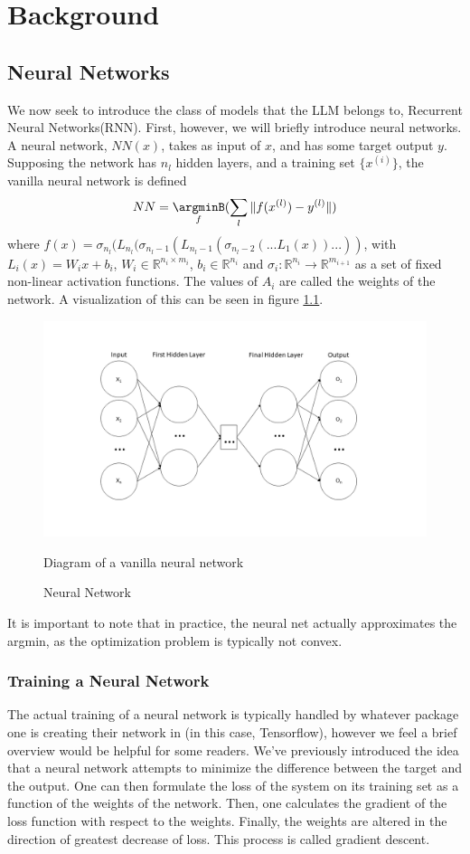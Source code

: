 \chapter{Background}
\label{Background}

\section{Neural Networks}
We now seek to introduce the class of models that the LLM belongs to, Recurrent Neural Networks(RNN). First, however, we will briefly introduce neural networks. A neural network, $NN(x)$, takes as input of $x$, and has some target output $y$. Supposing the network has $n_l$ hidden layers, and a training set $\{x^{(i)}\}$, the vanilla neural network is defined \begin{equation}
   NN = \underset{f}\argminB(\sum_l\|f(x^{(l)}) - y^{(l)}\|)
\end{equation} where $f(x) = \sigma_{n_l}(L_{n_l}(\sigma_{n_l-1}(L_{n_l-1}(\sigma_{n_l-2}(...L_1(x))...))$, with $L_i(x) = W_ix + b_i$, $W_i \in \mathbb{R}^{n_i\times m_i}$, $b_i \in \mathbb{R}^{n_i}$ and $\sigma_i:\mathbb{R}^{n_i} \xrightarrow{} \mathbb{R}^{m_{i+1}}$ as a set of fixed non-linear activation functions. The values of $A_i$ are called the weights of the network. A visualization of this can be seen in figure \ref{fig:NN}. 
\begin{figure}
    \centering
\includegraphics[width=1.0\textwidth]{figures/NN.png}
    \caption{Neural Network}
    \label{fig:NN}
    Diagram of a vanilla neural network
\end{figure}
It is important to note that in practice, the neural net actually approximates the argmin, as the optimization problem is typically not convex. 
\subsection{Training a Neural Network}
The actual training of a neural network is typically handled by whatever package one is creating their network in (in this case, Tensorflow), however we feel a brief overview would be helpful for some readers. We've previously introduced the idea that a neural network attempts to minimize the difference between the target and the output. One can then formulate the loss of the system on its training set as a function of the weights of the network. Then, one calculates the gradient of the loss function with respect to the weights. Finally, the weights are altered in the direction of greatest decrease of loss. This process is called gradient descent. 
